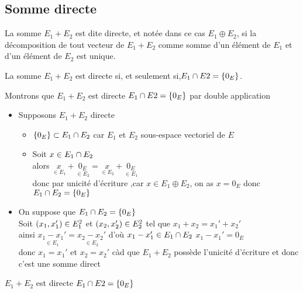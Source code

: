 \subsection{Somme directe}
\begin{defi}
    La somme \(E_1 + E_2\) est dite directe, et notée dans ce cas \(E_1 \oplus E_2\), si la décomposition de tout vecteur de \(E_1 + E_2\) comme somme d’un élément de \(E_1\) et d’un élément de \(E_2\) est unique.
\end{defi}
\begin{defprop}
    La somme \(E_1 + E_2\) est directe si, et seulement si,\( E_1 \cap E2 = \left\lbrace0_E \right\rbrace\).
\end{defprop}
\begin{dem}
    Montrons que \(E_1 + E_2\) est directe \ssi \( E_1 \cap E2 = \left\lbrace0_E \right\rbrace\) par double application
    \begin{itemize}
        \item \impdir Supposons \(E_1 + E_2\) directe\\
        \begin{itemize}
            \item \(\left\lbrace0_E\right\rbrace \subset E_1 \cap E_2\) car \(E_1\) et \(E_2\) sous-espace vectoriel de \(E\) \\
            \item Soit \(x \in E_1 \cap E_2\) \\
            alors \(\underset{\in E_1}{x} + \underset{\in E_2}{0_E} = \underset{\in E_2}{x} + \underset{\in E_1}{0_E}\)\\
            donc par unicité d'écriture ,car \(x \in E_1 \oplus E_2\), on as \(x = 0_E\) donc \(E_1 \cap E_2 = \left\lbrace0_E\right\rbrace\)
        \end{itemize}
        \item \imprec On suppose que \(E_1 \cap E_2 = \left\lbrace0_E\right\rbrace\) \\
        Soit \(\left(x_1,x_1'\right) \in E_1^2\) et \(\left(x_2, x_2'\right) \in E_2^2\) tel que \(x_1 + x_2 = x_1' + x_2'\)\\
        ainsi \(\underset{\in E_1}{x_1-x_1'} = \underset{\in E_2}{x_2 - x_2'}\) d'où \(x_1 - x_1' \in E_1 \cap E_2\) \ie \(x_1 - x_1' = 0_E\) \\
        donc \(x_1 = x_1'\) et \(x_2 = x_2'\) càd que \(E_1 + E_2\) possède l'unicité d'écriture et donc c'est une somme direct
    \end{itemize}
    \conclusion \(E_1 + E_2\) est directe \ssi \( E_1 \cap E2 = \left\lbrace0_E \right\rbrace\)
\end{dem}
